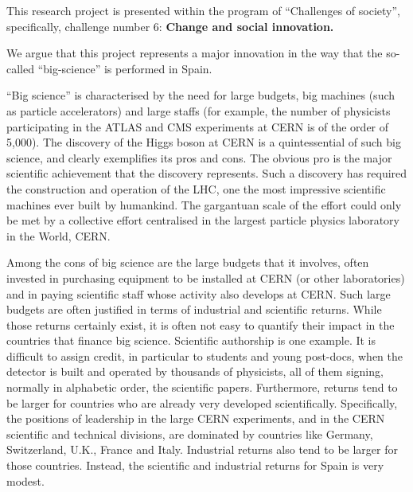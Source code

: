 %
This research project is presented within the program of ``Challenges of society'', specifically, challenge number 6: {\bf Change and social innovation.}

We argue that this project represents a major innovation in the way that the so-called ``big-science'' is performed in Spain.

``Big science'' is characterised by the need for large budgets, big machines (such as particle accelerators) and large staffs (for example, the number of physicists participating in the ATLAS and CMS experiments at CERN is of the order of 5,000). The discovery of the Higgs boson at CERN is a quintessential of such big science, and clearly exemplifies its pros and cons. The obvious pro is the major scientific achievement that the discovery represents. Such a discovery has required the construction and operation of the LHC, one the most impressive scientific machines ever built by humankind. The gargantuan scale of the effort could only be met by a collective effort centralised in the largest particle physics laboratory in the World, CERN.  

Among the cons of big science are the large budgets that it involves, often invested in purchasing equipment to be installed at CERN (or other laboratories) and in paying scientific staff whose activity also develops at CERN. Such large budgets are often justified in terms of industrial and scientific returns. While those returns certainly exist, it is often not easy to quantify their impact in the countries that finance big science. Scientific authorship is one example. It is difficult to assign credit, in particular to students and young post-docs, when the detector is built and operated by thousands of physicists, all of them signing, normally in alphabetic order, the scientific papers. Furthermore, returns tend to be larger for countries who are already very developed scientifically. Specifically, the positions of leadership in the large CERN experiments, and in the CERN scientific and technical divisions, are dominated by countries like Germany, Switzerland, U.K., France and Italy. Industrial returns also tend to be larger for those countries. Instead, the scientific and industrial returns for Spain is very modest. 

